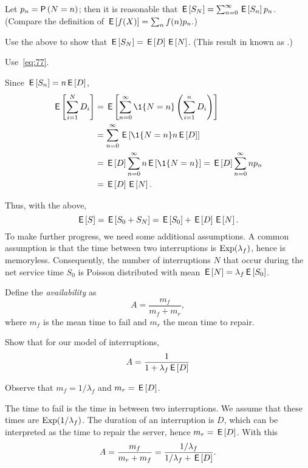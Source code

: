 Let $p_n=\P{N=n}$; then it is reasonable that $\,\mathsf{E}\left[S_N\right]=\sum_{n=0}^\infty \,\mathsf{E}\left[S_n\right]p_n$. (Compare the definition of $\,\mathsf{E}\left[f(X)\right]=\sum_{n} f(n) p_n$.)

\begin{exercise}[\faCalculator]\label{ex:16}
Use the above to show that $\,\mathsf{E}\left[S_N\right]=\,\mathsf{E}\left[D\right] \,\mathsf{E}\left[N\right]$. (This result in known as .)
\begin{hint}
  Use~\eqref{eq:77}. 
\end{hint}
\begin{solution}
Since $\,\mathsf{E}\left[S_n\right] = n \,\mathsf{E}\left[D\right]$, 
\begin{align*}
  \E{\sum_{i=1}^N D_i} 
&=  \E{ \sum_{n=0}^\infty \1{N=n} \left(\sum_{i=1}^n D_i \right)} \\
&=  \sum_{n=0}^\infty \E{\1{N=n} n\E{D}} \\
&=  \E{D} \sum_{n=0}^\infty n \E{\1{N=n}} = \E D \sum_{n=0}^\infty n p_n\\
&= \E D \E N.
\end{align*}
\end{solution}
\end{exercise}

Thus, with the above, 
\begin{equation*}
  \,\mathsf{E}\left[S\right] = \,\mathsf{E}\left[S_0 + S_N\right] = \,\mathsf{E}\left[S_0\right] + \,\mathsf{E}\left[D\right] \,\mathsf{E}\left[N\right].
\end{equation*}
To make further progress, we need some additional assumptions.
A common assumption is that the time between two interruptions is $\operatorname{Exp}(\lambda_f)$, hence is memoryless.
Consequently, the number of interruptions $N$ that occur during the net service time $S_0$ is  Poisson distributed with mean $\,\mathsf{E}\left[N\right] = \lambda_f \,\mathsf{E}\left[S_0\right]$.


Define the \emph{availability} as
\begin{equation*}
  A=\frac{m_f}{m_f + m_r},
\end{equation*}
where $m_f$ is the mean time to fail and $m_r$ the mean time to repair. 
\begin{exercise}[\faFlask]
  Show that  for our model of interruptions,
  \begin{equation*}
A=\frac 1{1+\lambda_f \,\mathsf{E}\left[D\right]}
  \end{equation*}
  \begin{hint}
    Observe that $m_f = 1/\lambda_f$ and $m_r = \,\mathsf{E}\left[D\right]$.
  \end{hint}
  \begin{solution}
The time to fail is the time in between two interruptions. We assume that these times are $\operatorname{Exp}(1/\lambda_f)$. The duration of an interruption is $D$, which can be interpreted as the time to repair the server, hence $m_r = \,\mathsf{E}\left[D\right]$. With this
\begin{equation*}
  A=\frac{m_f}{m_r + m_f}=\frac{1/\lambda_f }{1/\lambda_f + \,\mathsf{E}\left[D\right]}. 
\end{equation*}
  \end{solution}
\end{exercise}


